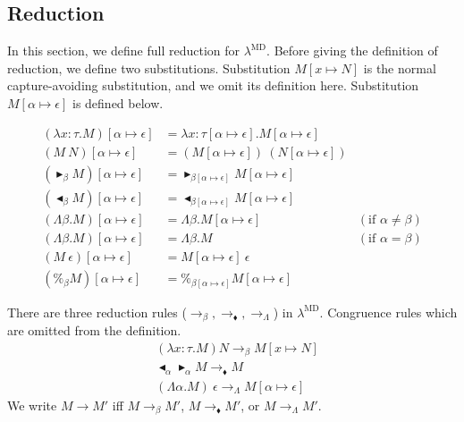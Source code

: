 \documentclass[runningheads]{llncs}
\newcommand{\LMD}{$\lambda^{\textrm{MD}}$\xspace}
\newcommand{\TB}{\blacktriangleright}
\newcommand{\TBL}{\blacktriangleleft}
\begin{document}
\subsection{Reduction}

In this section, we define full reduction for \LMD.
Before giving the definition of reduction, we define two substitutions.
Substitution $M[x\mapsto N]$ is the normal capture-avoiding substitution, and we omit its definition here.
Substitution $M[\alpha \mapsto \epsilon]$ is defined below.

\begin{align*}
    (\lambda x:\tau.M)[\alpha \mapsto \epsilon] & = \lambda x:\tau[\alpha \mapsto \epsilon].M[\alpha \mapsto \epsilon]                                  \\
    (M\ N)[\alpha \mapsto \epsilon]             & = (M[\alpha \mapsto \epsilon])\ (N[\alpha \mapsto \epsilon])                                          \\
    (\TB_\beta M)[\alpha \mapsto \epsilon]      & = \TB_{\beta[\alpha \mapsto \epsilon]} M[\alpha \mapsto \epsilon]                                     \\
    (\TBL_\beta M)[\alpha \mapsto \epsilon]     & = \TBL_{\beta[\alpha \mapsto \epsilon]} M[\alpha \mapsto \epsilon]                                    \\
    (\Lambda\beta.M)[\alpha \mapsto \epsilon]   & = \Lambda\beta.M[\alpha \mapsto \epsilon]                            & (\text{if } \alpha \neq \beta) \\
    (\Lambda\beta.M)[\alpha \mapsto \epsilon]   & = \Lambda\beta.M                                                     & (\text{if } \alpha = \beta)    \\
    (M\ \epsilon)[\alpha \mapsto \epsilon]      & = M[\alpha \mapsto \epsilon]\ \epsilon                                                                \\
    (\%_\beta M)[\alpha \mapsto \epsilon]       & = \%_{\beta[\alpha \mapsto \epsilon]}M[\alpha \mapsto \epsilon] 
\end{align*}

\begin{definition}[Reduction]
    There are three reduction rules ($\longrightarrow_\beta, \longrightarrow_\blacklozenge, \longrightarrow_\Lambda$) in \LMD.
    Congruence rules which are omitted from the definition.
    \begin{align*}
         & (\lambda x:\tau.M) N \longrightarrow_\beta M[x \mapsto N]                       \\
         & \TBL_\alpha \TB_\alpha M \longrightarrow_\blacklozenge M                        \\
         & (\Lambda \alpha.M)\ \epsilon \longrightarrow_\Lambda M[\alpha \mapsto \epsilon]
    \end{align*}
    We write $ M \longrightarrow M'$ iff $ M \longrightarrow_\beta M'$, $ M \longrightarrow_\blacklozenge M'$, or $ M \longrightarrow_\Lambda M'$.
\end{definition}
\end{document}
